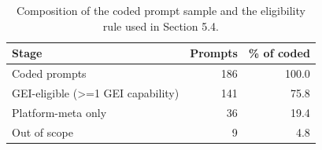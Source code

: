 \begin{table}[htbp]
\centering
\caption{Composition of the coded prompt sample and the eligibility rule used in Section 5.4.}
\label{tab:s5-funnel}
\begin{tabular}{lrr}
\toprule
Stage & Prompts & \% of coded \\
\midrule
Coded prompts & 186 & 100.0 \\
GEI-eligible (>=1 GEI capability) & 141 & 75.8 \\
Platform-meta only & 36 & 19.4 \\
Out of scope & 9 & 4.8 \\
\bottomrule
\end{tabular}
\par{}
\end{table}
